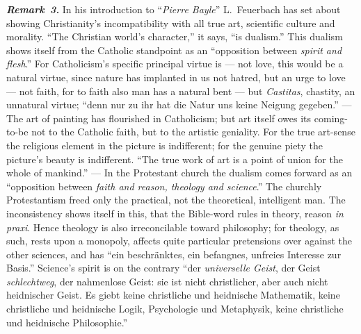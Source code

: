 \documentclass[12pt]{book}
\newcommand{\anm}[1]{\emph{\textbf{Remark~#1.}}}
\begin{document}
\anm{3} In his introduction to ``\textit{Pierre Bayle}'' L.\ Feuerbach has
set about showing Christianity's incompatibility with all true art,
scientific culture and morality. ``The Christian world's character,'' it
says, ``is dualism.'' This dualism shows itself from the Catholic standpoint
as an ``opposition between \emph{spirit and flesh}.'' For Catholicism's
specific principal virtue is --- not love, this would be a natural virtue,
since nature has implanted in us not hatred, but an urge to love --- not
faith, for to faith also man has a natural bent --- but \textit{Castitas},
chastity, an unnatural virtue; ``denn nur zu ihr hat die Natur uns keine
Neigung gegeben.'' --- The art of painting has flourished in Catholicism;
but art itself owes its coming-to-be not to the Catholic faith, but to the
artistic geniality. For the true art-sense the religious element in the
picture is indifferent; for the genuine piety the picture's beauty is
indifferent. ``The true work of art is a point of union for the whole of
mankind.'' --- In the Protestant church the dualism comes forward as an
``opposition between \emph{faith and reason, theology and science}.'' The
churchly Protestantism freed only the practical, not the theoretical,
intelligent man. The inconsistency shows itself in this, that the Bible-word
rules in theory, reason \textit{in praxi}. Hence theology is also
irreconcilable toward philosophy; for theology, as such, rests upon a
monopoly, affects quite particular pretensions over against the other
sciences, and has ``ein beschränktes, ein befangnes, unfreies Interesse zur
Basis.'' Science's spirit is on the contrary ``der \emph{universelle Geist},
der Geist \emph{schlechtweg}, der nahmenlose Geist: sie ist nicht
christlicher, aber auch nicht heidnischer Geist. Es giebt keine christliche
und heidnische Mathematik, keine christliche und heidnische Logik,
Psychologie und Metaphysik, keine christliche und heidnische Philosophie.''
\end{document}
